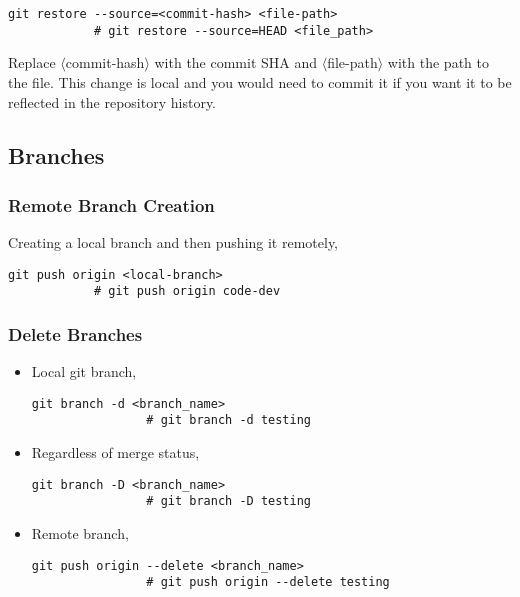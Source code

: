 \documentclass[12pt, a4paper]{article}
\numberwithin{equation}{section}
\theoremstyle{definition}
\theoremstyle{definition}
\begin{document}
		\begin{lstlisting}[style=mystylebash, label=alg:git_restore, xleftmargin=\parindent]
			git restore --source=<commit-hash> <file-path>
			# git restore --source=HEAD <file_path>
		\end{lstlisting}
		
		\noindent Replace $\langle$commit-hash$\rangle$ with the commit SHA and $\langle$file-path$\rangle$ with the path to the file. This change is local and you would need to commit it if you want it to be reflected in the repository history.
	
	\subsection{Branches}
	
	\subsubsection{Remote Branch Creation}
	
		Creating a local branch and then pushing it remotely,
		
		\begin{lstlisting}[style=mystylebash, xleftmargin=\parindent]
			git push origin <local-branch>
			# git push origin code-dev
		\end{lstlisting}
	
	\subsubsection{Delete Branches}
	
		\begin{itemize}
			\item Local git branch,
			
			\begin{lstlisting}[style=mystylebash, label=alg:git_delete_branch, xleftmargin=\parindent]
				git branch -d <branch_name>
				# git branch -d testing
			\end{lstlisting}
		
			\item Regardless of merge status,
			
			\begin{lstlisting}[style=mystylebash, label=alg:git_delete_branch__force, xleftmargin=\parindent]
				git branch -D <branch_name>
				# git branch -D testing
			\end{lstlisting}
		
			\item Remote branch,
			
			\begin{lstlisting}[style=mystylebash, label=alg:git_delete_branch__remote, xleftmargin=\parindent]
				git push origin --delete <branch_name>
				# git push origin --delete testing
			\end{lstlisting}
		\end{itemize}
	
\end{document}
